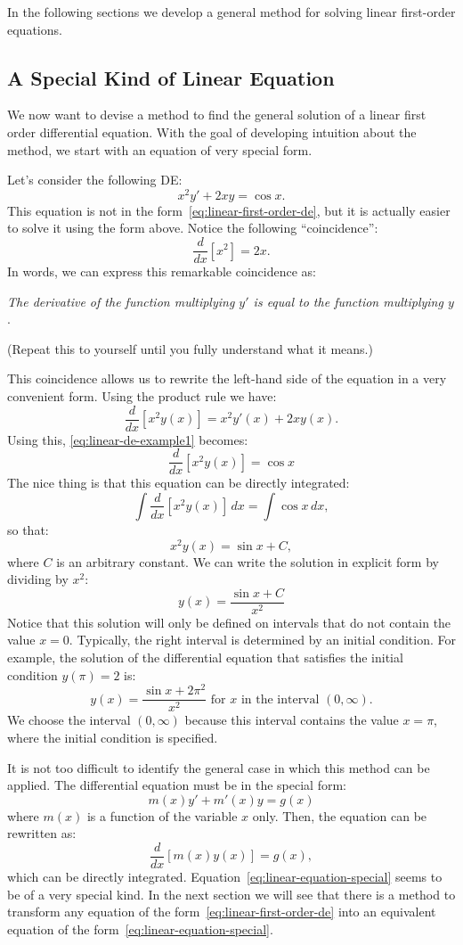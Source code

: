 \documentclass{ximera}
\begin{document}
In the following sections we develop a general method for solving linear first-order equations.
 
\subsection*{A Special Kind of Linear Equation}
We now want to devise a method to find the general solution of a linear first order differential equation. With the goal of developing intuition about the method, we start with an equation of very special form.
 
Let's consider the following DE:
\begin{equation}
\label{eq:linear-de-example1}
x^2y'+2xy=\cos x.
\end{equation}
This equation is not in the form~\ref{eq:linear-first-order-de}, but it is actually easier to solve it using the form above. Notice the following ``coincidence'':
\[
\frac{d}{dx}[x^2]=2x.
\]
In words, we can express this remarkable coincidence as:
 
\begin{center}
\emph{The derivative of the function multiplying $y'$ is equal to the function multiplying $y$}.
\end{center}
 
(Repeat this to yourself until you fully understand what it means.)
 
This coincidence allows us to rewrite the left-hand side of the equation in a very convenient form. Using the product rule we have:
\[
\frac{d}{dx}\left[x^2y(x)\right]=x^2y'(x)+2xy(x).
\]
Using this, \ref{eq:linear-de-example1} becomes:
\[
\frac{d}{dx}\left[x^2y(x)\right]=\cos x
\]
The nice thing is that this equation can be directly integrated:
\[
\int \frac{d}{dx}\left[x^2y(x)\right]\, dx = \int \cos x\,dx,
\]
so that:
\[
x^2y(x)=\sin x + C,
\]
where $C$ is an arbitrary constant. We can write the solution in explicit form by dividing by $x^2$:
\[
y(x)=\frac{\sin x + C}{x^2}
\]
Notice that this solution will only be defined on intervals that do not contain the value $x=0$. Typically, the right interval is determined by an initial condition. For example, the solution of the differential equation that satisfies the initial condition $y(\pi)=2$ is:
\[
y(x)=\frac{\sin x + 2\pi^2}{x^2}\text{ for $x$ in the interval $(0,\infty)$}.
\]
We choose the interval $(0,\infty)$ because this interval contains the value $x=\pi$, where the initial condition is specified.
 
It is not too difficult to identify the general case in which this method can be applied. The differential equation must be in the special form:
\begin{equation}
\label{eq:linear-equation-special}
m(x)y'+m'(x)y=g(x)
\end{equation}
where $m(x)$ is a function of the variable $x$ only. Then, the equation can be rewritten as:
\[
\frac{d}{dx}\left[m(x)y(x)\right]=g(x),
\]
which can be directly integrated. Equation~\ref{eq:linear-equation-special} seems to be of a very special kind. In the next section we will see that there is a method to transform any equation of the form~\ref{eq:linear-first-order-de} into an equivalent equation of the form~\ref{eq:linear-equation-special}.
 
\end{document}
